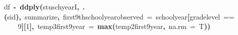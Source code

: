 \documentclass[12pt]{article}
\makeatletter
\newcommand{\hlnumber}[1]{\textcolor[rgb]{0,0,0}{#1}}%
\newcommand{\hlfunctioncall}[1]{\textcolor[rgb]{0.501960784313725,0,0.329411764705882}{\textbf{#1}}}%
\newcommand{\hlkeyword}[1]{\textcolor[rgb]{0,0,0}{\textbf{#1}}}%
\newcommand{\hlargument}[1]{\textcolor[rgb]{0.690196078431373,0.250980392156863,0.0196078431372549}{#1}}%
\newcommand{\hlassignement}[1]{\textcolor[rgb]{0,0,0}{\textbf{#1}}}%
\newcommand{\hlsymbol}[1]{\textcolor[rgb]{0,0,0}{#1}}%
\newcommand{\hlstd}[1]{\textcolor[rgb]{0,0,0}{#1}}%
\newenvironment{kframe}{%
 \def\FrameCommand##1{\hskip\@totalleftmargin \hskip-\fboxsep
 \colorbox{shadecolor}{##1}\hskip-\fboxsep
     \hskip-\linewidth \hskip-\@totalleftmargin \hskip\columnwidth}%
 \MakeFramed {\advance\hsize-\width
   \@totalleftmargin\z@ \linewidth\hsize
   \@setminipage}}%
 {\par\unskip\endMakeFramed}
\newenvironment{knitrout}{}{} %
\renewenvironment{knitrout}{\begin{footnotesize}}{\end{footnotesize}}
\makeatother
\begin{document}
\begin{knitrout}
\color{fgcolor}\begin{kframe}
\begin{flushleft}
\ttfamily\noindent
\hlsymbol{df}{\ }\hlassignement{\usebox{\hlnormalsizeboxlessthan}-}{\ }\hlfunctioncall{ddply}\hlkeyword{(}\hlsymbol{stuschyearI}\hlkeyword{,}{\ }\hlfunctioncall{.}\hlkeyword{(}\hlsymbol{sid}\hlkeyword{)}\hlkeyword{,}{\ }\hlsymbol{summarize}\hlkeyword{,}{\ }\hlargument{first9thschoolyear\usebox{\hlnormalsizeboxunderscore}observed}{\ }\hlargument{=}{\ }\hlsymbol{school\usebox{\hlnormalsizeboxunderscore}year}\hlkeyword{[}\hlsymbol{grade\usebox{\hlnormalsizeboxunderscore}level}{\ }==\hspace*{\fill}\\
\hlstd{}{\ }{\ }{\ }{\ }\hlnumber{9}\hlkeyword{]}\hlkeyword{[}\hlnumber{1}\hlkeyword{]}\hlkeyword{,}{\ }\hlargument{temp3\usebox{\hlnormalsizeboxunderscore}first9year}{\ }\hlargument{=}{\ }\hlfunctioncall{max}\hlkeyword{(}\hlsymbol{temp2\usebox{\hlnormalsizeboxunderscore}first9year}\hlkeyword{,}{\ }\hlargument{na.rm}{\ }\hlargument{=}{\ }\hlsymbol{T}\hlkeyword{)}\hlkeyword{)}\mbox{}
\normalfont
\end{flushleft}
\end{kframe}
\end{knitrout}
\end{document}
